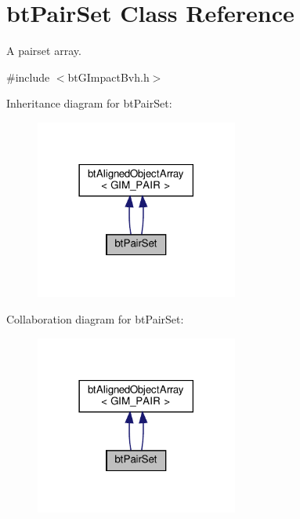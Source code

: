 \hypertarget{classbtPairSet}{}\section{bt\+Pair\+Set Class Reference}
\label{classbtPairSet}


A pairset array.  




{\ttfamily \#include $<$bt\+G\+Impact\+Bvh.\+h$>$}



Inheritance diagram for bt\+Pair\+Set\+:
\nopagebreak
\begin{figure}[H]
\begin{center}
\leavevmode
\includegraphics[width=189pt]{classbtPairSet__inherit__graph}
\end{center}
\end{figure}


Collaboration diagram for bt\+Pair\+Set\+:
\nopagebreak
\begin{figure}[H]
\begin{center}
\leavevmode
\includegraphics[width=189pt]{classbtPairSet__coll__graph}
\end{center}
\end{figure}
